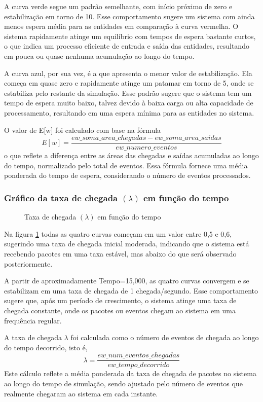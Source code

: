A curva verde segue um padrão semelhante, com início próximo de zero e estabilização em torno de 10. Esse comportamento sugere um sistema com ainda menos espera média para as entidades em comparação à curva vermelha. O sistema rapidamente atinge um equilíbrio com tempos de espera bastante curtos, o que indica um processo eficiente de entrada e saída das entidades, resultando em pouca ou quase nenhuma acumulação ao longo do tempo.

A curva azul, por sua vez, é a que apresenta o menor valor de estabilização. Ela começa em quase zero e rapidamente atinge um patamar em torno de 5, onde se estabiliza pelo restante da simulação. Esse padrão sugere que o sistema tem um tempo de espera muito baixo, talvez devido à baixa carga ou alta capacidade de processamento, resultando em uma espera mínima para as entidades no sistema.

O valor de E[w] foi calculado com base na fórmula 
$$
E[w] = \frac{ew\_soma\_area\_chegadas-ew\_soma\_area\_saidas}{ew\_numero\_eventos}
$$
o que reflete a diferença entre as áreas das chegadas e saídas acumuladas ao longo do tempo, normalizado pelo total de eventos. Essa fórmula fornece uma média ponderada do tempo de espera, considerando o número de eventos processados.

\subsubsection{Gráfico da taxa de chegada $(\lambda)$ em função do tempo}
\begin{figure}[h!]
   \centering
   
   \caption{Taxa de chegada $(\lambda)$ em função do tempo}
   \label{fig:lambda}
\end{figure}
Na figura \ref{fig:lambda} todas as quatro curvas começam em um valor entre 0,5 e 0,6, sugerindo uma taxa de chegada inicial moderada, indicando que o sistema está recebendo pacotes em uma taxa estável, mas abaixo do que será observado posteriormente.

A partir de aproximadamente Tempo=15,000, as quatro curvas convergem e se estabilizam em uma taxa de chegada de 1 chegada/segundo.
Esse comportamento sugere que, após um período de crescimento, o sistema atinge uma taxa de chegada constante, onde os pacotes ou eventos chegam ao sistema em uma frequência regular.

A taxa de chegada $\lambda$ foi calculada como o número de eventos de chegada ao longo do tempo decorrido, isto é,
$$
\lambda=\frac{ew\_num\_eventos\_chegadas}{ew\_tempo\_decorrido}
$$
Este cálculo reflete a média ponderada da taxa de chegada de pacotes no sistema ao longo do tempo de simulação, sendo ajustado pelo número de eventos que realmente chegaram ao sistema em cada instante.

